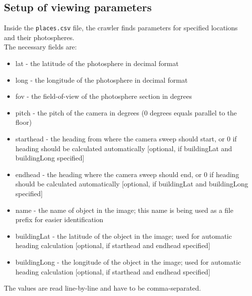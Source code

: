 \subsection{Setup of viewing parameters}\label{csv_file}
Inside the \texttt{places.csv} file, the crawler finds parameters for specified locations and their photospheres.\\
The necessary fields are:
\begin{itemize}
    \item{lat - the latitude of the photosphere in decimal format}
    \item{long - the longitude of the photosphere in decimal format}
    \item{fov - the field-of-view of the photosphere section in degrees}
    \item{pitch - the pitch of the camera in degrees (0 degrees equals parallel to the floor)}
    \item{starthead - the heading from where the camera sweep should start, or 0 if heading should be calculated automatically [optional, if buildingLat and buildingLong specified]}
    \item{endhead - the heading where the camera sweep should end, or 0 if heading should be calculated automatically [optional, if buildingLat and buildingLong specified]}
    \item{name - the name of object in the image; this name is being used as a file prefix for easier identification}
    \item{buildingLat - the latitude of the object in the image; used for automatic heading calculation [optional, if starthead and endhead specified]}
    \item{buildingLong - the longitude of the object in the image; used for automatic heading calculation [optional, if starthead and endhead specified]}
\end{itemize}

The values are read line-by-line and have to be comma-separated.

